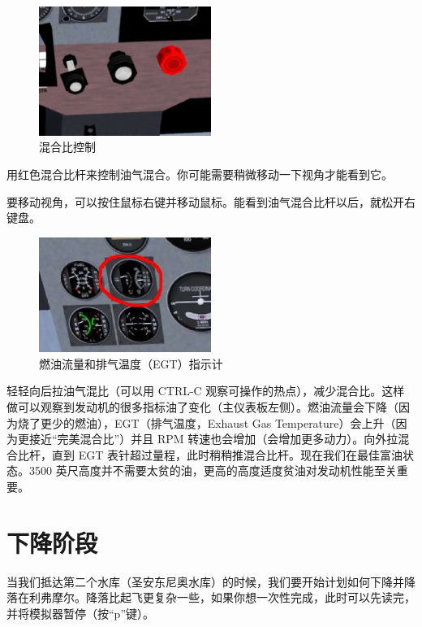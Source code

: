 \begin{figure}[!htp]
\centering
\includegraphics[width=0.5\textwidth]{mixture}
\caption{混合比控制\label{mixture}}
\end{figure}

用红色混合比杆来控制油气混合。你可能需要稍微移动一下视角才能看到它。

要移动视角，可以按住鼠标右键并移动鼠标。能看到油气混合比杆以后，就松开右键盘。

\begin{figure}[!htp]
\centering
\includegraphics[width=0.5\textwidth]{fuel_flow}
\caption{燃油流量和排气温度（EGT）指示计\label{egt}}
\end{figure}

轻轻向后拉油气混比（可以用 CTRL-C 观察可操作的热点），减少混合比。这样做可以观察到发动机的很多指标油了变化（主仪表板左侧）。燃油流量会下降（因为烧了更少的燃油），EGT（排气温度，Exhaust Gas Temperature）会上升（因为更接近“完美混合比”）并且 RPM 转速也会增加（会增加更多动力）。向外拉混合比杆，直到 EGT 表针超过量程，此时稍稍推混合比杆。现在我们在最佳富油状态。3500 英尺高度并不需要太贫的油，更高的高度适度贫油对发动机性能至关重要。

\section{下降阶段}

当我们抵达第二个水库（圣安东尼奥水库）的时候，我们要开始计划如何下降并降落在利弗摩尔。降落比起飞更复杂一些，如果你想一次性完成，此时可以先读完，并将模拟器暂停（按“p”键）。

